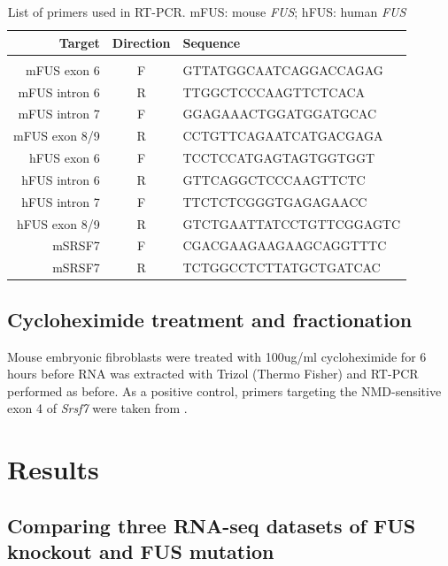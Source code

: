 \begin{table}[h!]
	\centering
	\begin{tabular}{rcl}
		\textbf{Target} & \textbf{Direction} & \textbf{Sequence}\\
		\hline \\[-0.3cm]
		mFUS exon 6  & F &  GTTATGGCAATCAGGACCAGAG\\
		mFUS intron 6 & R & TTGGCTCCCAAGTTCTCACA\\
		mFUS intron 7 & F &  GGAGAAACTGGATGGATGCAC\\
		mFUS exon 8/9 & R &  CCTGTTCAGAATCATGACGAGA\\[0.2cm]
		hFUS exon 6 & F & TCCTCCATGAGTAGTGGTGGT \\
		hFUS intron 6 & R & GTTCAGGCTCCCAAGTTCTC\\
		hFUS intron 7 & F & TTCTCTCGGGTGAGAGAACC\\
		hFUS exon 8/9 & R & GTCTGAATTATCCTGTTCGGAGTC\\[0.2cm]
		mSRSF7 & F &  CGACGAAGAAGAAGCAGGTTTC\\
		mSRSF7& R & TCTGGCCTCTTATGCTGATCAC\\
	\end{tabular}
	\caption{List of primers used in RT-PCR. mFUS: mouse \textit{FUS}; hFUS: human \textit{FUS}}
	\label{tab:fus_primers}
\end{table}

\subsection{Cycloheximide treatment and fractionation}
Mouse embryonic fibroblasts were treated with 100ug/ml cycloheximide for 6 hours before RNA was extracted with Trizol (Thermo Fisher) and RT-PCR performed as before. 
As a positive control, primers targeting the NMD-sensitive exon 4 of \textit{Srsf7} were taken from \citep{Edwards2016}.

\clearpage


\section{Results}

\subsection{ Comparing three RNA-seq datasets of FUS knockout and FUS mutation}

